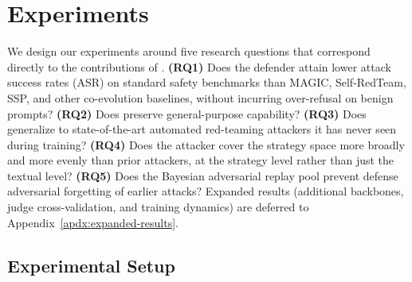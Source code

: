 \section{Experiments}
\label{sec:experiments}

We design our experiments around five research questions that correspond directly to the contributions of \method. \textbf{(RQ1)} Does the \method defender attain lower attack success rates (ASR) on standard safety benchmarks than MAGIC, Self-RedTeam, SSP, and other co-evolution baselines, without incurring over-refusal on benign prompts? \textbf{(RQ2)} Does \method preserve general-purpose capability? \textbf{(RQ3)} Does \method generalize to state-of-the-art automated red-teaming attackers it has never seen during training? \textbf{(RQ4)} Does the \method attacker cover the strategy space more broadly and more evenly than prior attackers, at the strategy level rather than just the textual level? \textbf{(RQ5)} Does the Bayesian adversarial replay pool prevent defense adversarial forgetting of earlier attacks? Expanded results (additional backbones, judge cross-validation, and training dynamics) are deferred to Appendix~\ref{apdx:expanded-results}.

\subsection{Experimental Setup}
\label{sec:exp-setup}

